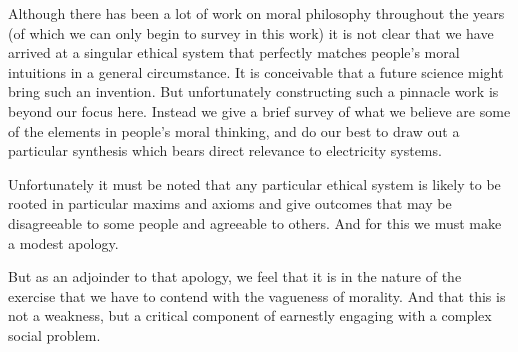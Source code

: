 \documentclass{article}
\begin{document}
Although there has been a lot of work on moral philosophy throughout the years (of which we can only begin to survey in this work) it is not clear that we have arrived at a singular ethical system that perfectly matches people's moral intuitions in a general circumstance. It is conceivable that a future science might bring such an invention.
But unfortunately constructing such a pinnacle work is beyond our focus here.
Instead we give a brief survey of what we believe are some of the elements in people's moral thinking, and do our best to draw out a particular synthesis which bears direct relevance to electricity systems.

Unfortunately it must be noted that any particular ethical system is likely to be rooted in particular maxims and axioms and give outcomes that may be disagreeable to some people and agreeable to others.
And for this we must make a modest apology.

But as an adjoinder to that apology, we feel that it is in the nature of the exercise that we have to contend with the vagueness of morality. And that this is not a weakness, but a critical component of earnestly engaging with a complex social problem.
\end{document}
